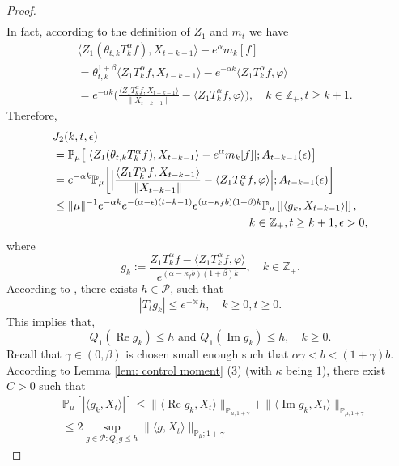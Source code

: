 \documentclass[12pt]{amsart}
\theoremstyle{plain}
\theoremstyle{definition}
\numberwithin{equation}{section}
\begin{document}
\begin{proof}
\begin{align}
\end{align}
    In fact, according to the definition of $Z_1$ and $m_t$ we have
    \begin{align}
          &\langle Z_1(\theta_{t,k}T_k^{\alpha}f),X_{t-k-1}\rangle-e^{\alpha}m_k[f]
          \\&= \theta_{t,k}^{1+\beta} \langle Z_1T_k^{\alpha}f,X_{t-k-1}\rangle - e^{-\alpha k}\langle  Z_1T_k^{\alpha}f,\varphi\rangle
          \\&=e^{-\alpha k}\Big(\frac{\langle Z_1T_k^{\alpha}f ,X_{t-k-1}\rangle}{\|X_{t-k-1}\|}-\langle  Z_1T_k^{\alpha}f ,\varphi\rangle\Big),
          \quad k\in \mathbb Z_+, t\geq k+1.
    \end{align}
Therefore,
\begin{align}
\label{eq: prevJ2}
&J_2(k,t,\epsilon)
	\\&= \mathbb P_\mu\big[|\langle Z_1(\theta_{t,k}T_k^{\alpha}f),X_{t-k-1}\rangle-e^{\alpha}m_k[f]|;A_{t-k-1}(\epsilon)\big]
    \\&=e^{-\alpha k}\mathbb{P}_{\mu}\bigg[\Big|\frac{\langle Z_1T^{\alpha}_k f,X_{t-k-1}\rangle}{\|X_{t-k-1}\|}-\langle  Z_1T^{\alpha}_k f,\varphi\rangle\Big|;A_{t-k-1}(\epsilon)\bigg]\nonumber\\
    &\leq \|\mu\|^{-1} e^{-\alpha k}e^{-(\alpha-\epsilon)(t-k-1)}e^{(\alpha-\kappa_f b)(1+\beta)k} \mathbb{P}_{\mu}\left[\left|\langle g_k,X_{t-k-1}\rangle\right|\right],
    \\& &\mathllap{k\in \mathbb Z_+, t\geq k+1, \epsilon > 0,}
\end{align}
where
\[
g_k
	:= \frac{Z_1 T^{\alpha}_k f-\langle  Z_1T^{\alpha}_k f,\varphi\rangle}{e^{(\alpha-\kappa_f b)(1+\beta)k}},
	\quad k \in \mathbb Z_+.
\]
According to \cite[Lemma 2.8]{MM}, there exists $h \in \mathcal P$, such that
\[
     |T_t g_k|\leq e^{-bt}h,
     \quad k\geq 0,t\geq 0.
\]
 	This implies that,
 \[
 	Q_1 (\operatorname{Re} g_k) \leq h
 	\text{ and } Q_1 (\operatorname{Im} g_k)\leq h,
 	\quad k \geq 0.
 \]
	Recall that $\gamma\in(0,\beta)$ is chosen small enough such that $\alpha \gamma < b < (1+\gamma)b$.
	According to Lemma \ref{lem: control moment} (3) (with $\kappa$ being $1$), there exist $C>0$ such that
\begin{align}
    &\mathbb{P}_{\mu}\left[\left|\langle g_k,X_{t}\rangle\right|\right]
    \leq \|\langle \operatorname{Re} g_k, X_{t}\rangle\|_{\mathbb{P}_{\mu,1+\gamma}} + \|\langle \operatorname{Im} g_k, X_{t}\rangle\|_{\mathbb{P}_{\mu,1+\gamma}}
    \\& \leq 2\sup_{g\in \mathcal P: Q_1 g\leq h} \|\langle g, X_t\rangle\|_{\mathbb P_\mu; 1+\gamma}

\end{align}
\end{proof}
\end{document}

